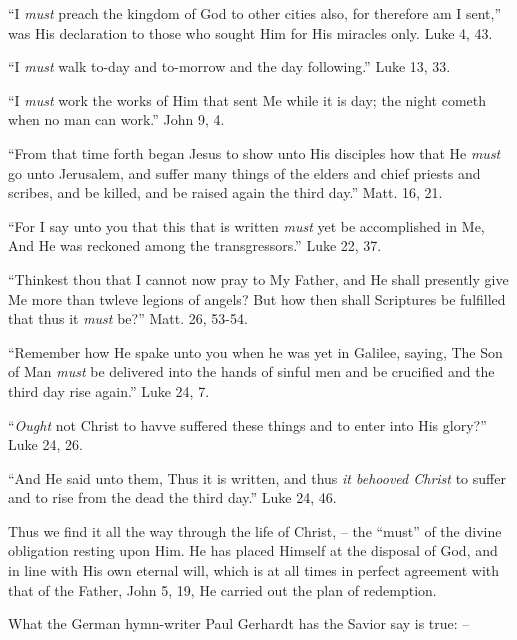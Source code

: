 \documentclass[
]{book}
\begin{document}
``I \emph{must} preach the kingdom of God to other cities also, for therefore am I sent,'' was His declaration to those who sought Him for His miracles only. Luke 4, 43.

``I \emph{must} walk to-day and to-morrow and the day following.'' Luke 13, 33.

``I \emph{must} work the works of Him that sent Me while it is day; the night cometh when no man can work.'' John 9, 4.

``From that time forth began Jesus to show unto His disciples how that He \emph{must} go unto Jerusalem, and suffer many things of the elders and chief priests and scribes, and be killed, and be raised again the third day.'' Matt. 16, 21.

``For I say unto you that this that is written \emph{must} yet be accomplished in Me, And He was reckoned among the transgressors.'' Luke 22, 37.

``Thinkest thou that I cannot now pray to My Father, and He shall presently give Me more than twleve legions of angels? But how then shall Scriptures be fulfilled that thus it \emph{must} be?'' Matt. 26, 53-54.

``Remember how He spake unto you when he was yet in Galilee, saying, The Son of Man \emph{must} be delivered into the hands of sinful men and be crucified and the third day rise again.'' Luke 24, 7.

``\emph{Ought} not Christ to havve suffered these things and to enter into His glory?'' Luke 24, 26.

``And He said unto them, Thus it is written, and thus \emph{it behooved Christ} to suffer and to rise from the dead the third day.'' Luke 24, 46.

Thus we find it all the way through the life of Christ, -- the ``must'' of the divine obligation resting upon Him. He has placed Himself at the disposal of God, and in line with His own eternal will, which is at all times in perfect agreement with that of the Father, John 5, 19, He carried out the plan of redemption.

What the German hymn-writer Paul Gerhardt has the Savior say is true: --
\end{document}
